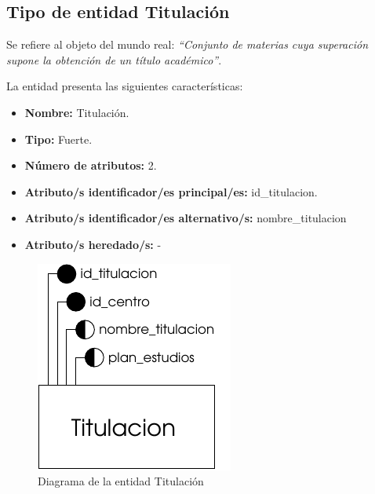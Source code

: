 \subsection{Tipo de entidad Titulación}

   \begin{description}

   \item[Definición] Se refiere al objeto del mundo real: \emph{``Conjunto de
        materias cuya superación supone la obtención de un título académico''}.

   \item[Características] La entidad presenta las siguientes características:
      \begin{itemize}
         \item \textbf{Nombre:} Titulación.
         \item \textbf{Tipo:} Fuerte.
         \item \textbf{Número de atributos:} 2.
         \item \textbf{Atributo/s identificador/es principal/es:} id\_titulacion.
         \item \textbf{Atributo/s identificador/es alternativo/s:} nombre\_titulacion
         \item \textbf{Atributo/s heredado/s:} -
      \end{itemize}

   \item[Diagrama]
   \item \begin{figure}[h!]
            \begin{center}
            \includegraphics[]{07.Modelo_Entidad-Interrelacion/7.2.Analisis_Entidades/diagramas/titulacion.pdf}
            \caption{Diagrama de la entidad Titulación}
            \end{center}
         \end{figure}


\end{description}
